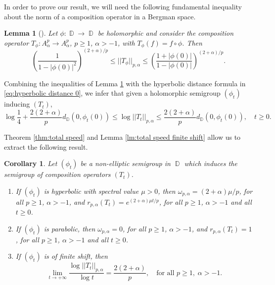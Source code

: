 \documentclass[11pt]{amsart}
\numberwithin{equation}{section}
\newtheorem{corollary}[theorem]{Corollary}
\newtheorem{lemma}[theorem]{Lemma}
\theoremstyle{definition}
\DeclareMathOperator{\D}{\mathbb{D}}
\begin{document}
	In order to prove our result, we will need the following fundamental inequality about the norm of a composition operator in a Bergman space.
	
	\begin{lemma}[{\cite[Section 11.3]{zhu}}]\label{lm:bergman estimate}
		Let $\phi:\D\to\D$ be holomorphic and consider the composition operator $T_\phi:A^p_\alpha\to A^p_\alpha$, $p\ge1$, $\alpha>-1$, with $T_\phi(f)=f\circ\phi$. Then
		$$\left(\dfrac{1}{1-|\phi(0)|^2}\right)^{(2+\alpha)/p} \le ||T_\phi||_{p,\alpha} \le \left(\dfrac{1+|\phi(0)|}{1-|\phi(0)|}\right)^{(2+\alpha)/p}.$$
	\end{lemma}
	
	Combining the inequalities of Lemma \ref{lm:bergman estimate} with the hyperbolic distance formula in \eqref{eq:hyperbolic distance 0}, we infer that given a holomorphic semigroup $(\phi_t)$ inducing $(T_t)$,
	\begin{equation}\label{eq:bergman hyperbolic estimate}
		\log\dfrac{1}{4}+\dfrac{2(2+\alpha)}{p}d_{\D}(0,\phi_t(0)) \le \log||T_t||_{p,\alpha} \le \dfrac{2(2+\alpha)}{p}d_{\D}(0,\phi_t(0)), \quad t\ge0.
	\end{equation}
	
	
	Theorem \ref{thm:total speed} and Lemma \ref{lm:total speed finite shift} allow us to extract the following result. 
	
	
	\begin{corollary}\label{cor:type bergman}
		Let $(\phi_t)$ be a non-elliptic semigroup in $\D$ which induces the semigroup of composition operators $(T_t)$.
		\begin{enumerate}
			\item[\textup{(a)}] If $(\phi_t)$ is hyperbolic with spectral value $\mu>0$, then $\omega_{p,\alpha}=(2+\alpha)\mu/p$, for all $p\ge1$, $\alpha>-1$, and $r_{p,\alpha}(T_t)=e^{(2+\alpha)\mu t/p}$, for all $p\ge1$, $\alpha>-1$ and all $t\ge0$.
			\item[\textup{(b)}] If $(\phi_t)$ is parabolic, then $\omega_{p,\alpha}=0$, for all $p\ge1$, $\alpha>-1$, and $r_{p,\alpha}(T_t)=1$, for all $p\ge1$, $\alpha>-1$ and all $t\ge0$.
			\item[\textup{(c)}] If $(\phi_t)$ is of finite shift, then
			$$\lim\limits_{t\to+\infty}\dfrac{\log||T_t||_{p,\alpha}}{\log t}=\dfrac{2(2+\alpha)}{p}, \quad\text{for all }p\ge1,\; \alpha>-1.$$
		\end{enumerate}
	\end{corollary}
	
	
	
\end{document}
